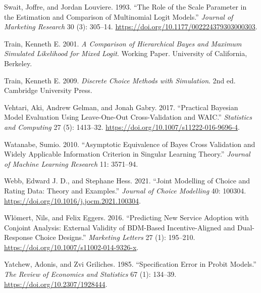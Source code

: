 \documentclass[
  letterpaper,
  DIV=11,
  numbers=noendperiod]{scrartcl}
\newlength{\cslhangindent}
\newenvironment{CSLReferences}[2] %
 {\begin{list}{}{%
  \setlength{\itemindent}{0pt}
  \setlength{\leftmargin}{0pt}
  \setlength{\parsep}{0pt}
  \ifodd #1
   \setlength{\leftmargin}{\cslhangindent}
   \setlength{\itemindent}{-1\cslhangindent}
  \fi
  \setlength{\itemsep}{#2\baselineskip}}}
 {\end{list}}
\theoremstyle{plain}
\theoremstyle{plain}
\theoremstyle{plain}
\theoremstyle{remark}
\begin{document}
\begin{CSLReferences}{1}{1}
Swait, Joffre, and Jordan Louviere. 1993. {``The Role of the Scale
Parameter in the Estimation and Comparison of Multinomial Logit
Models.''} \emph{Journal of Marketing Research} 30 (3): 305--14.
\url{https://doi.org/10.1177/002224379303000303}.

Train, Kenneth E. 2001. \emph{A Comparison of Hierarchical {Bayes} and
Maximum Simulated Likelihood for Mixed Logit}. Working Paper. University
of California, Berkeley.

Train, Kenneth E. 2009. \emph{Discrete Choice Methods with Simulation}.
2nd ed. Cambridge University Press.

Vehtari, Aki, Andrew Gelman, and Jonah Gabry. 2017. {``Practical
{Bayesian} Model Evaluation Using Leave-One-Out Cross-Validation and
{WAIC}.''} \emph{Statistics and Computing} 27 (5): 1413--32.
\url{https://doi.org/10.1007/s11222-016-9696-4}.

Watanabe, Sumio. 2010. {``Asymptotic Equivalence of {Bayes} Cross
Validation and Widely Applicable Information Criterion in Singular
Learning Theory.''} \emph{Journal of Machine Learning Research} 11:
3571--94.

Webb, Edward J. D., and Stephane Hess. 2021. {``Joint Modelling of
Choice and Rating Data: Theory and Examples.''} \emph{Journal of Choice
Modelling} 40: 100304. \url{https://doi.org/10.1016/j.jocm.2021.100304}.

Wlömert, Nils, and Felix Eggers. 2016. {``Predicting New Service
Adoption with Conjoint Analysis: External Validity of {BDM}-Based
Incentive-Aligned and Dual-Response Choice Designs.''} \emph{Marketing
Letters} 27 (1): 195--210.
\url{https://doi.org/10.1007/s11002-014-9326-x}.

Yatchew, Adonis, and Zvi Griliches. 1985. {``Specification Error in
Probit Models.''} \emph{The Review of Economics and Statistics} 67 (1):
134--39. \url{https://doi.org/10.2307/1928444}.

\end{CSLReferences}
\end{document}
